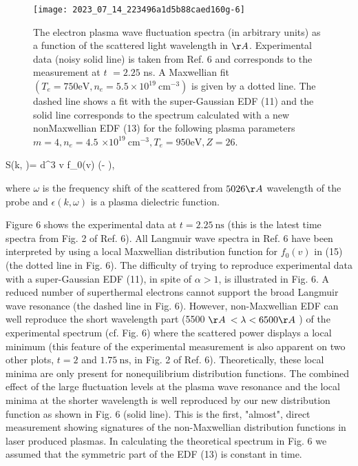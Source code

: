 \documentclass[oneside,onecolumn]{article}
\begin{document}
\begin{sloppypar}
 \begin{figure}[htbp]
 	\centering
 	\texttt{[image: 2023\_07\_14\_223496a1d5b88caed160g-6]}
 	\caption{The electron plasma wave fluctuation spectra (in arbitrary units) as a function of the scattered light wavelength in $\AA$. Experimental data (noisy solid line) is taken from Ref. 6 and corresponds to the measurement at $t$ $=2.25$ ns. A Maxwellian fit $\left(T_{e}=750 \mathrm{eV}, n_{e}=5.5 \times 10^{19} \mathrm{~cm}^{-3}\right)$ is given by a dotted line. The dashed line shows a fit with the super-Gaussian EDF (11) and the solid line corresponds to the spectrum calculated with a new nonMaxwellian EDF (13) for the following plasma parameters $m=4, n_{e}=4.5$ $\times 10^{19} \mathrm{~cm}^{-3}, T_{e}=950 \mathrm{eV}, Z=26$.}
 	\label{figure6}
 \end{figure}
 
 
 S(k, \omega)= \int d^{3} v f_{0}(v) \delta(\omega- \cdot {}),
 
 where $\omega$ is the frequency shift of the scattered from $5026 \AA$ wavelength of the probe and $\epsilon(k, \omega)$ is a plasma dielectric function.
 
 Figure 6 shows the experimental data at $t=2.25 \mathrm{~ns}$ (this is the latest time spectra from Fig. 2 of Ref. 6). All Langmuir wave spectra in Ref. 6 have been interpreted by using a local Maxwellian distribution function for $f_{0}(v)$ in (15) (the dotted line in Fig. 6). The difficulty of trying to reproduce experimental data with a super-Gaussian EDF (11), in spite of $\alpha>1$, is illustrated in Fig. 6. A reduced number of superthermal electrons cannot support the broad Langmuir wave resonance (the dashed line in Fig. 6). However, non-Maxwellian EDF can well reproduce the short wavelength part (5500 $\AA$ $<\lambda<6500 \AA$ ) of the experimental spectrum (cf. Fig. 6) where the scattered power displays a local minimum (this feature of the experimental measurement is also apparent on two other plots, $t=2$ and $1.75 \mathrm{~ns}$, in Fig. 2 of Ref. 6). Theoretically, these local minima are only present for nonequilibrium distribution functions. The combined effect of the large fluctuation levels at the plasma wave resonance and the local minima at the shorter wavelength is well reproduced by our new distribution function as shown in Fig. 6 (solid line). This is the first, "almost", direct measurement showing signatures of the non-Maxwellian distribution functions in laser produced plasmas. In calculating the theoretical spectrum in Fig. 6 we assumed that the symmetric part of the EDF (13) is constant in time.
 

\end{sloppypar}
\end{document}
